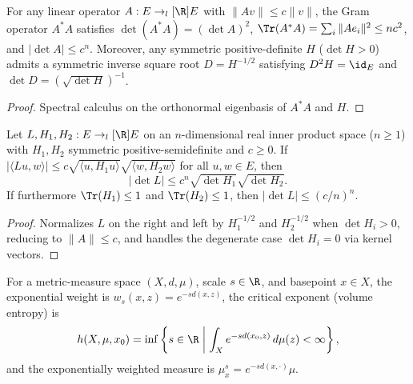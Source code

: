 \begin{theorem}
\label{thm_gram_det}
\leanok
{}
For any linear operator $A : E \to_l[\R] E$ with $\|A v\| \le c \|v\|$, the Gram operator $A^* A$ satisfies $\det(A^* A) = (\det A)^2$, $\Tr(A^* A) = \sum_i \|A e_i\|^2 \le n c^2$, and $|\det A| \le c^n$. Moreover, any symmetric positive-definite $H$ ($\det H > 0$) admits a symmetric inverse square root $D = H^{-1/2}$ satisfying $D^2 H = \id_E$ and $\det D = (\sqrt{\det H})^{-1}$.
\end{theorem}
\begin{proof}\leanok Spectral calculus on the orthonormal eigenbasis of $A^* A$ and $H$.\end{proof}

\begin{theorem}
\label{thm_bilinear_cs_det}
\leanok
{}
Let $L, H_1, H_2 : E \to_l[\R] E$ on an $n$-dimensional real inner product space ($n \ge 1$) with $H_1, H_2$ symmetric positive-semidefinite and $c \ge 0$. If $|\langle L u, w\rangle| \le c \sqrt{\langle u, H_1 u\rangle}\sqrt{\langle w, H_2 w\rangle}$ for all $u, w \in E$, then
$$|\det L| \le c^n \sqrt{\det H_1}\sqrt{\det H_2}.$$
If furthermore $\Tr(H_1) \le 1$ and $\Tr(H_2) \le 1$, then $|\det L| \le (c/n)^n$.
\end{theorem}
\begin{proof}\leanok Normalizes $L$ on the right and left by $H_1^{-1/2}$ and $H_2^{-1/2}$ when $\det H_i > 0$, reducing to $\|A\| \le c$, and handles the degenerate case $\det H_i = 0$ via kernel vectors.\end{proof}

\begin{definition}
\label{def_critical_exponent}
\leanok
For a metric-measure space $(X, d, \mu)$, scale $s \in \R$, and basepoint $x \in X$, the exponential weight is $w_s(x, z) = e^{-s d(x, z)}$, the critical exponent (volume entropy) is
$$h(X, \mu, x_0) = \inf\left\{s \in \R \;\middle|\; \int_X e^{-s d(x_0, z)}\,d\mu(z) < \infty\right\},$$
and the exponentially weighted measure is $\mu_x^s = e^{-s d(x, \cdot)}\mu$.
\end{definition}

